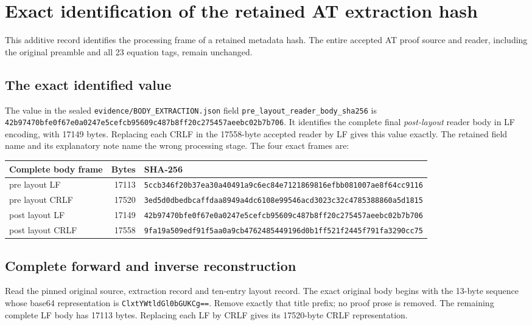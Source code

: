 \begingroup
\small
\section{Exact identification of the retained AT extraction hash}
This additive record identifies the processing frame of a retained metadata
hash. The entire accepted AT proof source and reader, including the original
preamble and all 23 equation tags, remain unchanged.

\subsection{The exact identified value}
The value in the sealed
\nolinkurl{evidence/BODY_EXTRACTION.json} field
\nolinkurl{pre_layout_reader_body_sha256} is
\nolinkurl{42b97470bfe0f67e0a0247e5cefcb95609c487b8ff20c275457aeebc02b7b706}.
It identifies the complete final \emph{post-layout} reader body in LF
encoding, with 17149 bytes. Replacing each CRLF in the 17558-byte accepted
reader by LF gives this value exactly. The retained field name and its
explanatory note name the wrong processing stage. The four exact frames are:

\begin{longtable}{@{}p{.23\linewidth}r p{.57\linewidth}@{}}
\toprule Complete body frame & Bytes & SHA-256 \\
\midrule
pre layout LF & 17113 & \nolinkurl{5ccb346f20b37ea30a40491a9c6ec84e7121869816efbb081007ae8f64cc9116} \\
pre layout CRLF & 17520 & \nolinkurl{3ed5d0dbedbcaffdaa8949a4dc6108e99546acd3023c32c4785388860a5d1815} \\
post layout LF & 17149 & \nolinkurl{42b97470bfe0f67e0a0247e5cefcb95609c487b8ff20c275457aeebc02b7b706} \\
post layout CRLF & 17558 & \nolinkurl{9fa19a509edf91f5aa0a9cb4762485449196d0b1ff521f2445f791fa3290cc75} \\
\bottomrule
\end{longtable}

\subsection{Complete forward and inverse reconstruction}
Read the pinned original source, extraction record and ten-entry layout
record. The exact original body begins with the 13-byte sequence whose
base64 representation is \nolinkurl{ClxtYWtldGl0bGUKCg==}.
Remove exactly that title prefix; no proof prose is removed.
The remaining complete LF body has 17113 bytes. Replacing each LF by CRLF
gives its 17520-byte CRLF representation.


